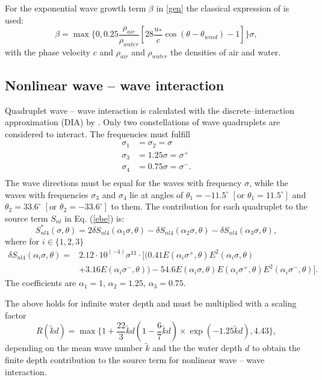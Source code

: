 For the exponential wave growth term $\beta$ in \eqref{gen} the classical expression of \citep[][]{komen1984} is used:
\begin{equation}
 \beta = \max \{ 0,0.25 \frac{\rho_{air}}{\rho_{water}} \left[28 \frac{u_\ast}{c} \cos(\theta - \theta_{wind}) -1 \right] \} \sigma,
\end{equation}
with the phase velocity $c$ and $\rho_{air}$ and $\rho_{water}$ the densities of air and water.

\subsection{Nonlinear wave -- wave interaction}

Quadruplet wave -- wave interaction is calculated with the discrete--interaction approximation (DIA) by \citep[][]{hasselmann1985}. Only two constellations of wave quadruplets are considered to interact. The frequencies must fulfill
\begin{align*}
 \sigma_1 &= \sigma_2 = \sigma \\
 \sigma_3 &= 1.25 \sigma = \sigma^+ \\
 \sigma_4 &= 0.75 \sigma = \sigma^- .\\
\end{align*}
The wave directions must be equal for the waves with frequency $\sigma$, while the waves with frequencies $\sigma_3$ and $\sigma_4$ lie at angles of $\theta_1 = -11.5^\circ \; \left[ \text{or } \theta_1 = 11.5^\circ \right]$ and $\theta_2 = 33.6^\circ \; \left[ \text{or } \theta_2 = -33.6^\circ \right]$  to them. The contribution for each quadruplet to the source term $S_{nl}$ in Eq. (\ref{ebe}) is:
\begin{equation}
 S_{nl4}^\ast (\sigma, \theta) = 2 \delta S_{nl4} (\alpha_1 \sigma, \theta) - \delta S_{nl4} (\alpha_2 \sigma, \theta) - \delta S_{nl4} (\alpha_3 \sigma, \theta),
\end{equation}
where for $i \in \{1,2,3\}$
\begin{align*}
 \delta S_{nl4} ( \alpha_i \sigma, \theta ) = & 2.12 \cdot 10^{(-4)} \sigma^{11} \cdot [ ( 0.41 E(\alpha_i \sigma^+, \theta)E^2(\alpha_i \sigma, \theta) \\
 &+ 3.16 E(\alpha_i \sigma^-, \theta) ) - 54.6 E(\alpha_i \sigma, \theta) E(\alpha_i \sigma^+, \theta) E^2(\alpha_i \sigma^-, \theta) ] .
\end{align*}
The coefficients are $\alpha_1 = 1, \, \alpha_2 = 1.25, \, \alpha_3 = 0.75$. 

The above holds for infinite water depth and must be multiplied with a scaling 
factor 
\begin{equation}
 R ( \tilde{k}d ) = \max \{ 1+ \frac{22}{3}\tilde{k}d \left( 1-\frac{6}{7} \tilde{k}d \right) \times \exp(-1.25 \tilde{k}d) , 4.43 \} ,
\end{equation}
depending on the mean wave number $\tilde{k}$ and the the water depth $d$ to obtain the finite depth contribution to the source term for nonlinear wave -- wave interaction.

